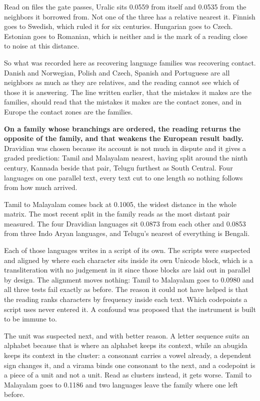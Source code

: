 Read on files the gate passes, Uralic sits 0.0559 from itself and 0.0535 from the neighbors it borrowed from. Not one of the three has a relative nearest it. Finnish goes to Swedish, which ruled it for six centuries. Hungarian goes to Czech. Estonian goes to Romanian, which is neither and is the mark of a reading close to noise at this distance.

So what was recorded here as recovering language families was recovering contact. Danish and Norwegian, Polish and Czech, Spanish and Portuguese are all neighbors as much as they are relatives, and the reading cannot see which of those it is answering. The line written earlier, that the mistakes it makes are the families, should read that the mistakes it makes are the contact zones, and in Europe the contact zones are the families.

\textbf{On a family whose branchings are ordered, the reading returns the opposite of the family, and that weakens the European result badly.} Dravidian was chosen because its account is not much in dispute and it gives a graded prediction: Tamil and Malayalam nearest, having split around the ninth century, Kannada beside that pair, Telugu furthest as South Central. Four languages on one parallel text, every text cut to one length so nothing follows from how much arrived.

Tamil to Malayalam comes back at 0.1005, the widest distance in the whole matrix. The most recent split in the family reads as the most distant pair measured. The four Dravidian languages sit 0.0873 from each other and 0.0853 from three Indo Aryan languages, and Telugu's nearest of everything is Bengali.

Each of those languages writes in a script of its own. The scripts were suspected and aligned by where each character sits inside its own Unicode block, which is a transliteration with no judgement in it since those blocks are laid out in parallel by design. The alignment moves nothing: Tamil to Malayalam goes to 0.0980 and all three tests fail exactly as before. The reason it could not have helped is that the reading ranks characters by frequency inside each text. Which codepoints a script uses never entered it. A confound was proposed that the instrument is built to be immune to.

The unit was suspected next, and with better reason. A letter sequence suits an alphabet because that is where an alphabet keeps its context, while an abugida keeps its context in the cluster: a consonant carries a vowel already, a dependent sign changes it, and a virama binds one consonant to the next, and a codepoint is a piece of a unit and not a unit. Read as clusters instead, it gets worse. Tamil to Malayalam goes to 0.1186 and two languages leave the family where one left before.

